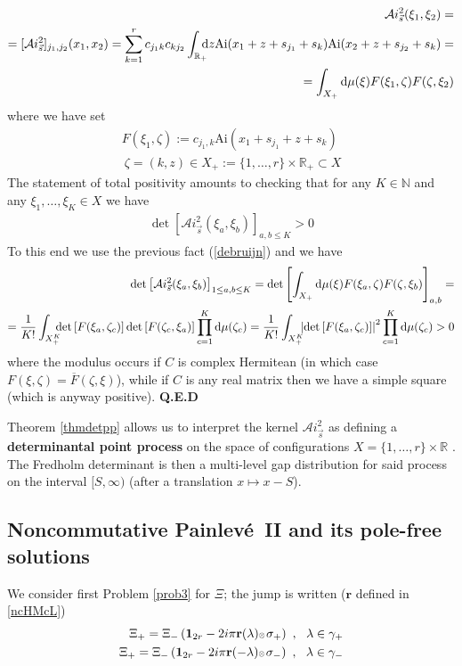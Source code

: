 \documentclass{article}
\def\ot{\hbox{\resizebox{6pt}{!}{$ \otimes \,
$}}}
\def\r{ {\mathbf r}}
\def\s{\sigma}
\def\R{{\mathbb R}}
\def\d{{\rm d}}
\def\1{\mathbf 1}
\def\Ai{\mathrm{Ai}}
\def\Ai{\mathrm{Ai}}
\def\ov{\overline}
\def\QED{ {\bf Q.E.D}\par \vskip 4pt}
\newcommand{\be}{\begin{eqnarray}}
\newcommand{\ee}{\end{eqnarray}}
\def\le{\left}
\def\ri{\right}
\begin{document}
 \be
 \mathcal Ai_{\vec s}^2(\xi_1,\xi_2) = \\=
 [\mathcal Ai_{\vec s}^2]_{j_1,j_2}(x_1,x_2) = \sum_{k=1}^r c_{j_1k}c_{k j_2} \int_{\R_+} \!\!\!\! \d z\Ai(x_1+z+s_{j_1}+s_k) \Ai(x_2+z+s_{j_2}+s_k)=\\
 =\int_{X_+}\d\mu(\xi) F(\xi_1,\zeta) F(\zeta, \xi_2)
 \ee
where we have set 
\be
F(\xi_1,\zeta):= c_{j_1,k} \Ai(x_1+s_{j_1} +z+ s_k) \\
\ \zeta=(k,z)\in X_+:= \{1,\dots,r\}\times \R_+\subset X
\ee
The statement of total positivity amounts to checking that for any $K\in \mathbb N$ and any $\xi_1,\dots, \xi_K\in X$ we have 
\be
\det\le[\mathcal Ai_{\vec s}^{2}(\xi_a,\xi_b)\ri]_{a,b\leq K}>0
\ee
To this end we use the previous fact (\ref{debruijn}) and we have 
\be
\det \le[ \mathcal Ai_{\vec s}^2(\xi_a,\xi_b)\ri]_{1\leq a,b\leq K} = \det \le[\int_{X_+}\d\mu(\xi) F(\xi_a,\zeta) F(\zeta,\xi_b)\ri]_{a,b} = \\
=\frac 1 {K!} \int_{X_+^K}\!\!\!\! \det \le[F(\xi_a,\zeta_c)\ri]  \det \le[F(\zeta_c,\xi_a)\ri]  \prod_{c=1}^K \d\mu(\zeta_c)= \frac 1 {K!} \int_{X_+^K}\!\!\! \le| \det \le[F(\xi_a,\zeta_c)\ri] \ri|^2 \prod_{c=1}^K \d\mu(\zeta_c)>0
\ee
where the modulus occurs if $C$ is complex Hermitean (in which case $F(\xi,\zeta)= \ov F(\zeta,\xi)$), while if $C$ is any real matrix then we have a simple square (which is anyway positive).
 \QED

 Theorem \ref{thmdetpp} allows us to interpret the kernel $\mathcal Ai^2_{\vec s}$ as defining a {\bf determinantal point process} on the space of configurations $X=\{1,\dots, r\}\times \R$ \cite{Sosh:RandomPointFields}. The Fredholm determinant is then a multi-level gap distribution for said process on the interval $[S,\infty)$ (after a translation $x\mapsto x-S$).
 \subsection{Noncommutative Painlev\'e\ II and its pole-free solutions}
 \label{PIILax}
We consider first Problem \ref{prob3} for $\Xi$; the jump is written ($\r$ defined in \ref{ncHMcL})
\be
\Xi_+ = \Xi_- \le(\1_{2r} - 2i\pi \r(\lambda) \ot  \s_+\ri) \ ,\ \ \lambda\in \gamma_+\\
\Xi_+ = \Xi_- \le(\1_{2r} - 2i\pi \r(-\lambda) \ot  \s_-\ri) \ ,\ \ \lambda\in \gamma_-
\ee
\end{document}

